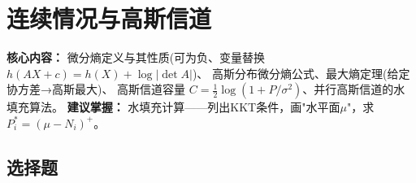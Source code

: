 \documentclass[12pt,a4paper]{ctexart}
\begin{document}
\newpage

\section{连续情况与高斯信道}

\begin{notetested}
\textbf{核心内容：} 微分熵定义与其性质(可为负、变量替换$h(AX+c)=h(X)+\log|\det A|$)、
高斯分布微分熵公式、最大熵定理(给定协方差→高斯最大)、
高斯信道容量 $C = \frac{1}{2}\log(1+P/\sigma^2)$、并行高斯信道的水填充算法。
\textbf{建议掌握：} 水填充计算——列出KKT条件，画"水平面$\mu$"，求 $P_i^* = (\mu - N_i)^+$。
\end{notetested}

\subsection*{选择题}
\end{document}
